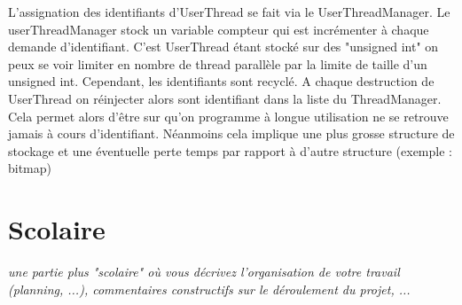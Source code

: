 \documentclass{article}
\begin{document}
L'assignation des identifiants d'UserThread se fait via le UserThreadManager. Le userThreadManager stock un variable compteur qui est incrémenter à chaque demande d'identifiant. C'est UserThread étant stocké sur des "unsigned int" on peux se voir limiter en nombre de thread parallèle par la limite de taille d'un unsigned int. Cependant, les identifiants sont recyclé. A chaque destruction de UserThread on réinjecter alors sont identifiant dans la liste du ThreadManager. Cela permet alors d'être sur qu'on programme à longue utilisation ne se retrouve jamais à cours d'identifiant. Néanmoins cela implique une plus grosse structure de stockage et une éventuelle perte temps par rapport à d'autre structure (exemple : bitmap)

\section{Scolaire}
\textit{une partie plus "scolaire" où vous décrivez l'organisation de votre travail (planning, ...), commentaires constructifs sur le déroulement du projet, ...}
\vspace{5mm}
\end{document}
